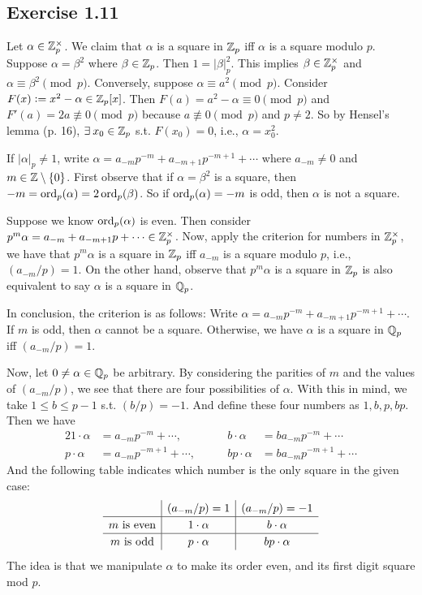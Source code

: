 \documentclass[../Koblitz.tex]{subfiles}
\begin{document}
\subsection*{Exercise 1.11}

Let $\alpha\in\mathbb{Z}_p^\times$. We claim that $\alpha$ is a square in $\mathbb{Z}_p$ iff $\alpha$ is a square modulo $p$. Suppose $\alpha=\beta^2$ where $\beta\in\mathbb{Z}_p$. Then $1=|\beta|_p^2$. This implies $\beta\in\mathbb{Z}_p^\times$ and $\alpha\equiv \beta^2 \pmod{p}$. Conversely, suppose $\alpha\equiv a^2 \pmod{p}$. Consider $F(x):=x^2-\alpha\in\mathbb{Z}_p[x]$. Then $F(a)=a^2-\alpha\equiv0\pmod{p}$ and $F'(a)=2a\not\equiv0 \pmod{p}$ because $a\not\equiv0\pmod{p}$ and $p\neq2$. So by Hensel's lemma (p. 16), $\exists x_0\in\ZZ_p$ s.t. $F(x_0)=0$, i.e., $\alpha=x_0^2$.

If $|\alpha|_p\neq1$, write $\alpha=a_{-m}p^{-m}+a_{-m+1}p^{-m+1}+\cdots$ where $a_{-m}\neq0$ and $m\in\mathbb{Z}\setminus\{0\}$. First observe that if $\alpha=\beta^2$ is a square, then $-m=\operatorname{ord}_p(\alpha)=2\operatorname{ord}_p(\beta)$. So if $\operatorname{ord}_p(\alpha)=-m$ is odd, then $\alpha$ is not a square.

Suppose we know $\operatorname{ord}_p(\alpha)$ is even. Then consider $p^m\alpha = a_{-m}+a_{-m+1}p+\cdots\in\mathbb{Z}_p^\times$. Now, apply the criterion for numbers in $\mathbb{Z}_p^\times$, we have that $p^m\alpha$ is a square in $\mathbb{Z}_p$ iff $a_{-m}$ is a square modulo $p$, i.e., $(a_{-m}/p)=1$. On the other hand, observe that $p^m\alpha$ is a square in $\mathbb{Z}_p$ is also equivalent to say $\alpha$ is a square in $\mathbb{Q}_p$.

In conclusion, the criterion is as follows: Write $\alpha=a_{-m}p^{-m}+a_{-m+1}p^{-m+1}+\cdots$. If $m$ is odd, then $\alpha$ cannot be a square. Otherwise, we have $\alpha$ is a square in $\mathbb{Q}_p$ iff $(a_{-m}/p)=1$.

Now, let $0\neq\alpha\in\mathbb{Q}_p$ be arbitrary. By considering the parities of $m$ and the values of $(a_{-m}/p)$, we see that there are four possibilities of $\alpha$. With this in mind, we take $1\leq b\leq p-1$ s.t. $(b/p)=-1$. And define these four numbers as $1,b,p,bp$. Then we have
\begin{alignat*}{2}
1\cdot\alpha &= a_{-m}p^{-m}+\cdots, &\qquad b\cdot\alpha &= ba_{-m}p^{-m}+\cdots \\
p\cdot\alpha &= a_{-m}p^{-m+1}+\cdots, &\qquad bp\cdot\alpha &= ba_{-m}p^{-m+1}+\cdots
\end{alignat*}
And the following table indicates which number is the only square in the given case:
$$
\def\arraystretch{1.2}
\begin{array}{c|c|c}
 & (a_{-m}/p)=1 & (a_{-m}/p)=-1 \\
\hline
m \text{ is even} & 1\cdot\alpha & b\cdot\alpha \\
\hline
m \text{ is odd} & p\cdot\alpha & bp\cdot\alpha
\end{array}
$$
The idea is that we manipulate $\alpha$ to make its order even, and its first digit square mod $p$.
\end{document}
